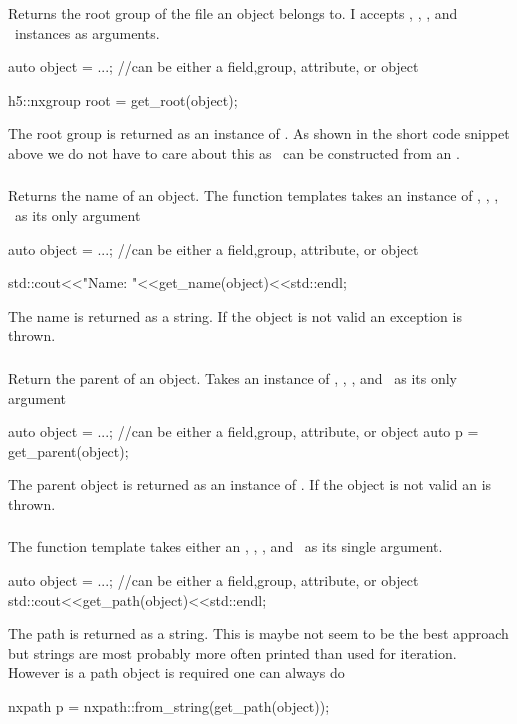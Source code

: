 Returns the root group of the file an object belongs to. I accepts \nxobject,
\nxattribute, \nxfield, and \nxgroup\ instances as arguments. 
\begin{cppcode}
auto object = ...; //can be either a field,group, attribute, or object

h5::nxgroup root = get_root(object);
\end{cppcode}
The root group is returned as an instance of \nxobject. As shown in the short
code snippet above we do not have to care about this as \nxgroup\ can be
constructed from an \nxobject.

\subsubsection{}

Returns the name of an object. The function templates takes an instance of 
\nxobject, \nxfield, \nxattribute, \nxgroup\ as its only argument
\begin{cppcode}
auto object = ...; //can be either a field,group, attribute, or object

std::cout<<"Name: "<<get_name(object)<<std::endl;
\end{cppcode}
The name is returned as a string. If the object is not valid an
 exception is thrown.

\subsubsection{}

Return the parent of an object. Takes an instance of \nxobject, \nxfield,
\nxattribute, and \nxgroup\ as its only argument
\begin{cppcode}
auto object = ...; //can be either a field,group, attribute, or object
auto p = get_parent(object);
\end{cppcode}
The parent object is returned as an instance of \nxobject. If the object is not
valid an  is thrown.

\subsubsection{}

The  function template takes either an \nxobject, \nxattribute,
\nxfield, and \nxgroup\ as its single argument.
\begin{cppcode}
auto object = ...; //can be either a field,group, attribute, or object
std::cout<<get_path(object)<<std::endl;
\end{cppcode}
The path is returned as a string. This is maybe not seem to be the best approach
but strings are most probably more often printed than used for iteration. 
However is a path object is required one can always do
\begin{cppcode}
nxpath p = nxpath::from_string(get_path(object));
\end{cppcode}

